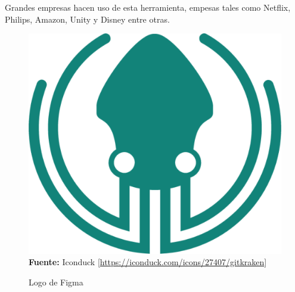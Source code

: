 Grandes empresas hacen uso de esta herramienta, empesas tales como Netflix,
Philips, Amazon, Unity y Disney entre otras.

\begin{figure}[htb!]
    \centering
    \caption{Logo de Figma}\label{fig:gitkraken-logo}
    \centering
    \includegraphics[scale=0.15]{./Ilustraciones/logos/gitkraken-logo.png}\\
    \textbf{Fuente:} Iconduck [\url{https://iconduck.com/icons/27407/gitkraken}]
\end{figure}